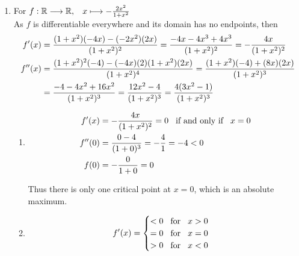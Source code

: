 \documentclass[12pt]{amsart}
\begin{document}
\begin{enumerate}
\begin{enumerate}
		\end{enumerate}
	\bigskip	
	\item For $f: \mathbb{R} \longrightarrow \mathbb{R}, \hspace{0.3cm} x\longmapsto-\frac{2x^2}{1+x^2}$ \\
		As $f$ is differentiable everywhere and its domain has no endpoints, then
			\begin{align}
				f'(x)&=\frac{(1+x^2)(-4x)-(-2x^2)(2x)}{(1+x^2)^2}=\frac{-4x-4x^3+4x^3}{(1+x^2)^2}=
				-\frac{4x}{(1+x^2)^2} \notag \\
				f''(x)&=\frac{(1+x^2)^2(-4)-(-4x)(2)(1+x^2)(2x)}{(1+x^2)^4}=
				\frac{(1+x^2)(-4)+(8x)(2x)}{(1+x^2)^3} \notag \\
				&=\frac{-4-4x^2+16x^2}{(1+x^2)^3}=\frac{12x^2-4}{(1+x^2)^3}=
				\frac{4(3x^2-1)}{(1+x^2)^3} \notag 
			\end{align}
			
		\begin{enumerate}
		
			\item 
				\begin{align}
					f'(x)&=-\frac{4x}{(1+x^2)^2}=0 \hspace{0.3cm} \text{if and only if} \hspace{0.3cm}x=0					\notag \\
					f''(0)&=\frac{0-4}{(1+0)^3}=-\frac{4}{1}=-4 < 0 \notag \\
					f(0) & = -\frac{0}{1+0} = 0 \notag
			\end{align}
			
			Thus there is only one critical point at $x=0$, which is an absolute maximum.
			\item 
				\begin{align}
					f'(x)=
					\begin{cases}
						< 0 \hspace{0.3cm} \text{for} \hspace{0.3cm} x>0 \notag \\
						= 0 \hspace{0.3cm} \text{for} \hspace{0.3cm} x=0 \notag \\
						> 0 \hspace{0.3cm} \text{for} \hspace{0.3cm} x<0 \notag
					\end{cases}
				\end{align}
			

\end{enumerate}
\end{enumerate}
\end{document}
